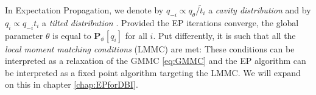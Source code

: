 In Expectation Propagation, we denote by $q_{-i}\propto q_{\theta}/\tilde t_{i}$ a \emph{cavity distribution} and by $q_{i}\propto q_{-i}t_{i}$ a \emph{tilted distribution} \citep{seeger07, gelman14}. Provided the EP iterations converge, the global parameter $\theta$ is equal to $\mathbf P_\phi[q_i]$ for all $i$. Put differently, it is such that all the \emph{local moment matching conditions} (LMMC) are met:
%
%
These conditions can be interpreted as a relaxation of the GMMC \eqref{eq:GMMC} and the EP algorithm can be interpreted as a fixed point algorithm targeting the LMMC. We will expand on this in chapter \ref{chap:EPforDBI}.
